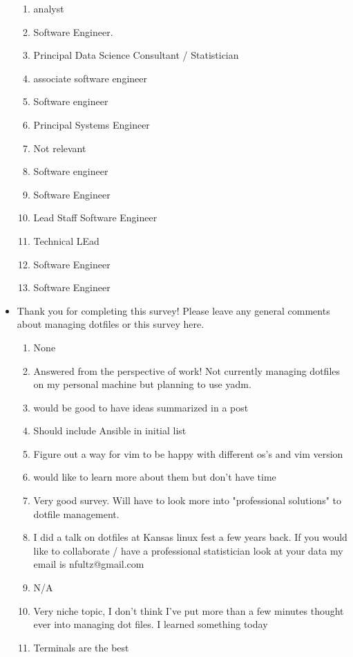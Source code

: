 \documentclass[letterpaper]{jdf}
\begin{document}
\begin{itemize}
\begin{enumerate}
        \item analyst
        \item Software Engineer.
        \item Principal Data Science Consultant / Statistician
        \item associate software engineer
        \item Software engineer
        \item Principal Systems Engineer
        \item Not relevant
        \item Software engineer
        \item Software Engineer
        \item Lead Staff Software Engineer
        \item Technical LEad
        \item Software Engineer
        \item Software Engineer
    \end{enumerate}
    \item Thank you for completing this survey! Please leave any general comments about managing dotfiles or this survey here.
    \begin{enumerate}
        \item None
        \item Answered from the perspective of work! Not currently managing dotfiles on my personal machine but planning to use yadm.
        \item would be good to have ideas summarized in a post
        \item Should include Ansible in initial list
        \item Figure out a way for vim to be happy with different os’s and vim version
        \item would like to learn more about them but don't have time
        \item Very good survey. Will have to look more into "professional solutions" to dotfile management.
        \item I did a talk on dotfiles at Kansas linux fest a few years back. If you would like to collaborate / have a professional statistician look at your data my email is nfultz@gmail.com
        \item N/A
        \item Very niche topic, I don't think I've put more than a few minutes thought ever into managing dot files. I learned something today
        \item Terminals are the best

\end{enumerate}
\end{itemize}
\end{document}
